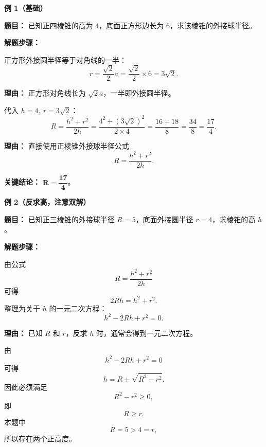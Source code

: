\begin{examplebox}

	\textbf{\textcolor{CExample}{例 1（基础）}}

	\textbf{\textcolor{CExample}{题目：}} 已知正四棱锥的高为 $4$，底面正方形边长为 $6$，求该棱锥的外接球半径。

	\textbf{\textcolor{CExample}{解题步骤：}}
	\begin{description}[style=nextline, leftmargin=2.8em, labelsep=0.5em, itemsep=0.45em]
		\item[\textbf{第一步（求外接圆半径）：}]
		      正方形外接圆半径等于对角线的一半：
		      \[
			      r=\frac{\sqrt2}{2}a=\frac{\sqrt2}{2}\times 6=3\sqrt2.
		      \]
		      \par\textbf{理由：} 正方形对角线长为 $\sqrt2a$，一半即外接圆半径。

		\item[\textbf{第二步（套用公式）：}]
		      代入 $h=4,\ r=3\sqrt2$：
		      \[
			      R
			      =
			      \frac{h^2+r^2}{2h}
			      =
			      \frac{4^2+(3\sqrt2)^2}{2\times4}
			      =
			      \frac{16+18}{8}
			      =
			      \frac{34}{8}
			      =
			      \frac{17}{4}.
		      \]
		      \par\textbf{理由：} 直接使用正棱锥外接球半径公式
		      \[
			      R=\frac{h^2+r^2}{2h}.
		      \]
	\end{description}

	\textbf{\textcolor{CExample}{关键结论：}} $\mathbf{R=\dfrac{17}{4}}$。

	\medskip
	\textbf{\textcolor{CExample}{例 2（反求高，注意双解）}}

	\textbf{\textcolor{CExample}{题目：}} 已知正三棱锥的外接球半径 $R=5$，底面外接圆半径 $r=4$，求棱锥的高 $h$。

	\textbf{\textcolor{CExample}{解题步骤：}}
	\begin{description}[style=nextline, leftmargin=2.8em, labelsep=0.5em, itemsep=0.45em]

		\item[\textbf{第一步（列出方程）：}]
		      由公式
		      \[
			      R=\frac{h^2+r^2}{2h}
		      \]
		      可得
		      \[
			      2Rh=h^2+r^2.
		      \]
		      整理为关于 $h$ 的一元二次方程：
		      \[
			      h^2-2Rh+r^2=0.
		      \]

		      \par\textbf{理由：} 已知 $R$ 和 $r$，反求 $h$ 时，通常会得到一元二次方程。

		\item[\textbf{第二步（写出一般解并检查条件）：}]
		      由
		      \[
			      h^2-2Rh+r^2=0
		      \]
		      可得
		      \[
			      h=R\pm\sqrt{R^2-r^2}.
		      \]
		      因此必须满足
		      \[
			      R^2-r^2\ge0,
		      \]
		      即
		      \[
			      R\ge r.
		      \]
		      本题中
		      \[
			      R=5>4=r,
		      \]
		      所以存在两个正高度。


\end{description}
\end{examplebox}

